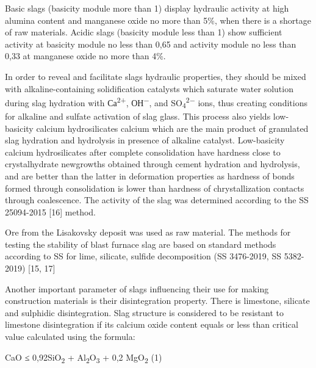Basic slags (basicity module more than 1) display hydraulic activity at
high alumina content and manganese oxide no more than 5\%, when there is
a shortage of raw materials. Acidic slags (basicity module less than 1)
show sufficient activity at basicity module no less than 0,65 and
activity module no less than 0,33 at manganese oxide no more than 4\%.

In order to reveal and facilitate slags\textquotesingle{} hydraulic
properties, they should be mixed with alkaline-containing solidification
catalysts which saturate water solution during slag hydration with
Са\textsuperscript{2+}, ОН\textsuperscript{−}, and
SO\textsubscript{4}\textsuperscript{2−} ions, thus creating conditions
for alkaline and sulfate activation of slag glass. This process also
yields low-basicity calcium hydrosilicates calcium which are the main
product of granulated slag hydration and hydrolysis in presence of
alkaline catalyst. Low-basicity calcium hydrosilicates after complete
consolidation have hardness close to crystalhydrate newgrowths obtained
through cement hydration and hydrolysis, and are better than the latter
in deformation properties as hardness of bonds formed through
consolidation is lower than hardness of chrystallization contacts
through coalescence. The activity of the slag was determined according
to the SS 25094-2015 {[}16{]} method.

Ore from the Lisakovsky deposit was used as raw material. The methods
for testing the stability of blast furnace slag are based on standard
methods according to SS for lime, silicate, sulfide decomposition (SS
3476-2019, SS 5382-2019) {[}15, 17{]}

Another important parameter of slags influencing their use for making
construction materials is their disintegration property. There is
limestone, silicate and sulphidic disintegration. Slag structure is
considered to be resistant to limestone disintegration if its calcium
oxide content equals or less than critical value calculated using the
formula:

CaO ≤ 0,92SiO\textsubscript{2} + Al\textsubscript{2}O\textsubscript{3} +
0,2 MgO\textsubscript{2} (1)

